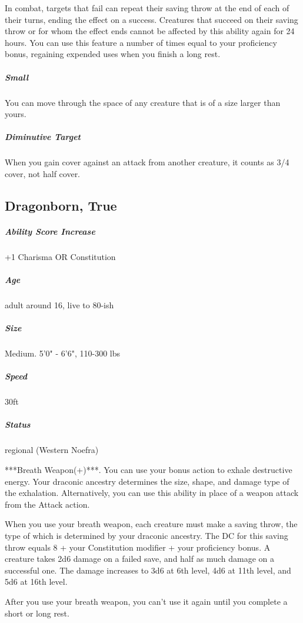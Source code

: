 In combat, targets that fail can repeat their saving throw at the end of each of their turns, ending the effect on a success. Creatures that succeed on their saving throw or for whom the effect ends cannot be affected by this ability again for 24 hours. You can use this feature a number of times equal to your proficiency bonus, regaining expended uses when you finish a long rest.

\subparagraph*{Small}  You can move through the space of any creature that is of a size larger than yours.

\subparagraph*{Diminutive Target}  When you gain cover against an attack from another creature, it counts as 3/4 cover, not half cover.

\subsection{Dragonborn, True}

\subparagraph*{Ability Score Increase}  +1 Charisma OR Constitution

\subparagraph*{Age}  adult around 16, live to 80-ish

\subparagraph*{Size}  Medium. 5'0" - 6'6", 110-300 lbs

\subparagraph*{Speed}  30ft

\subparagraph*{Status}  regional (Western Noefra)

***Breath Weapon(+)***. You can use your bonus action to exhale destructive energy. Your draconic ancestry determines the size, shape, and damage type of the exhalation. Alternatively, you can use this ability in place of a weapon attack from the Attack action.

When you use your breath weapon, each creature must make a saving throw, the type of which is determined by your draconic ancestry. The DC for this saving throw equals 8 + your Constitution modifier + your proficiency bonus. A creature takes 2d6 damage on a failed save, and half as much damage on a successful one. The damage increases to 3d6 at 6th level, 4d6 at 11th level, and 5d6 at 16th level.

After you use your breath weapon, you can’t use it again until you complete a short or long rest.

